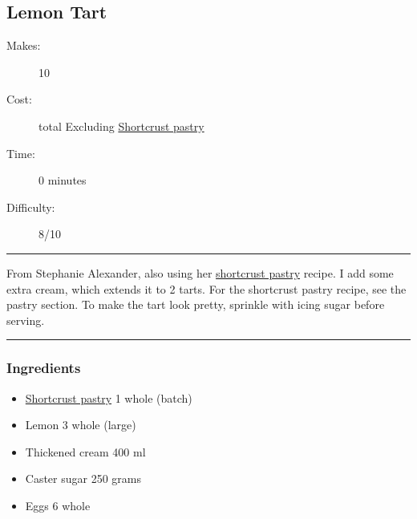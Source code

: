 \documentclass[]{article}
\begin{document}
\subsection*{\center\huge Lemon Tart}
\begin{description}
\item[Makes:] 10 
\item[Cost:]  total Excluding \hyperref[rec:Shortcrust Pastry]{Shortcrust pastry}
\item[Time:] 0 minutes
\item[Difficulty:] 8/10
\end{description}
\vspace{0.2cm}\hrule\vspace{0.5cm}
\begin{adjustwidth}{0.5 cm}{0.5 cm}

From Stephanie Alexander, also using her \hyperref[rec:Shortcrust Pastry]{shortcrust pastry} recipe. I add some extra cream, which extends it to 2 tarts. For the shortcrust pastry recipe, see the pastry section. To make the tart look pretty, sprinkle with icing sugar before serving. \hfill\color{accent}{\Large\faVimeoSquare\hspace{0.1cm}\faGlide\hspace{0.1cm}\faHeart\hspace{0.1cm}}\color{black}

\end{adjustwidth}
\vspace{0.5cm}\hrule
\subsubsection*{\Large Ingredients}
\begin{multicols}{2}
\begin{itemize}
 \item \hyperref[rec:Shortcrust Pastry]{Shortcrust pastry} \hfill 1 whole (batch)
 \item Lemon \hfill 3 whole (large)
 \item Thickened cream \hfill 400 ml
 \item Caster sugar \hfill 250 grams
 \item Eggs \hfill 6 whole
\end{itemize}
\end{multicols}
\end{document}
